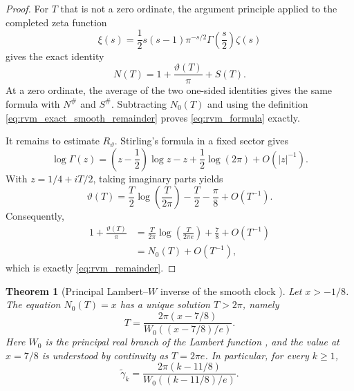 \documentclass[11pt]{amsart}
\numberwithin{equation}{section}
\theoremstyle{plain}
\newtheorem{theorem}{Theorem}[section]
\theoremstyle{definition}
\theoremstyle{remark}
\newcommand{\1}{\mathbf{1}}
\begin{document}
\begin{proof}
For \(T\) that is not a zero ordinate, the argument principle applied to
the completed zeta function
\begin{equation}
\xi(s)
=
\frac12s(s-1)\pi^{-s/2}\Gamma\!\left(\frac s2\right)\zeta(s)
\label{eq:rvm_xi_definition}
\end{equation}
gives the exact identity
\begin{equation}
N(T)
=
1+\frac{\vartheta(T)}{\pi}+S(T).
\label{eq:rvm_theta_exact}
\end{equation}
At a zero ordinate, the average of the two one-sided identities gives the
same formula with \(N^{\#}\) and \(S^{\#}\).  Subtracting \(N_0(T)\) and
using the definition \eqref{eq:rvm_exact_smooth_remainder} proves
\eqref{eq:rvm_formula} exactly.

It remains to estimate \(R_\vartheta\).  Stirling's formula in a fixed
sector gives
\begin{equation}
\log\Gamma(z)
=
\left(z-\frac12\right)\log z-z+\frac12\log(2\pi)
+
O(|z|^{-1}).
\label{eq:rvm_stirling}
\end{equation}
With \(z=1/4+iT/2\), taking imaginary parts yields
\begin{equation}
\vartheta(T)
=
\frac T2\log\!\left(\frac{T}{2\pi}\right)
-
\frac T2
-
\frac\pi8
+
O(T^{-1}).
\label{eq:rvm_theta_asymptotic}
\end{equation}
Consequently,
\begin{align}
1+\frac{\vartheta(T)}{\pi}
&=
\frac{T}{2\pi}\log\!\left(\frac{T}{2\pi e}\right)
+\frac78+O(T^{-1})
\label{eq:rvm_substitution_one}
\\
&=
N_0(T)+O(T^{-1}),
\label{eq:rvm_substitution_two}
\end{align}
which is exactly \eqref{eq:rvm_remainder}.
\end{proof}


\begin{theorem}[Principal Lambert--\(W\) inverse of the smooth clock {}]
\label{thm:rvm_lambert_inverse}
Let \(x>-1/8\).  The equation \(N_0(T)=x\) has a unique solution
\(T>2\pi\), namely
\begin{equation}
\boxed{
T
=
\frac{2\pi(x-7/8)}
{W_0\!\left((x-7/8)/e\right)}.
}
\label{eq:rvm_lambert_inverse}
\end{equation}
Here \(W_0\) is the principal real branch of the Lambert function
\cite{Corless1996}, and the value at \(x=7/8\) is
understood by continuity as \(T=2\pi e\).  In particular, for every
\(k\geq1\),
\begin{equation}
\widetilde\gamma_k
=
\frac{2\pi(k-11/8)}
{W_0\!\left((k-11/8)/e\right)}.
\label{eq:rvm_gamma_tilde}
\end{equation}
\end{theorem}
\end{document}
